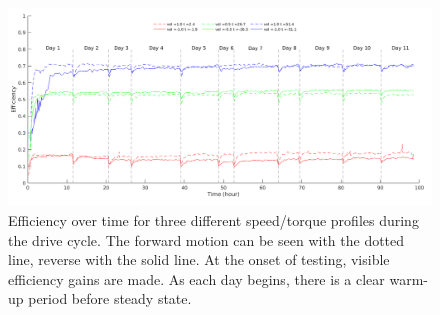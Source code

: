 \begin{figure}[t]
   \centering
   \includegraphics[width=\linewidth]{images/long_run_plot_v4}
   \caption{Efficiency over time for three different speed/torque profiles during the drive cycle.
   The forward motion can be seen with the dotted line, reverse with the solid line.
   At the onset of testing, visible efficiency gains are made.
   As each day begins, there is a clear warm-up period before steady state.
   }
   \label{long_run}
\end{figure}

